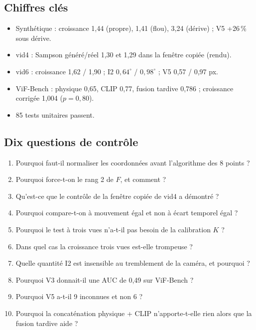 \documentclass[11pt,a4paper]{article}
\begin{document}
\subsection{Chiffres clés}
\begin{itemize}[nosep]
  \item Synthétique : croissance 1,44 (propre), 1,41 (flou), 3,24 (dérive) ; V5 +26\,\% sous dérive.
  \item vid4 : Sampson généré/réel 1,30 et 1,29 dans la fenêtre copiée (rendu).
  \item vid6 : croissance 1,62 / 1,90 ; I2 $0{,}64^\circ$ / $0{,}98^\circ$ ; V5 0,57 / 0,97 px.
  \item ViF-Bench : physique 0,65, CLIP 0,77, fusion tardive 0,786 ; croissance corrigée 1,004 ($p=0{,}80$).
  \item 85 tests unitaires passent.
\end{itemize}

\subsection{Dix questions de contrôle}
\begin{enumerate}
  \item Pourquoi faut-il normaliser les coordonnées avant l'algorithme des 8 points ?
  \item Pourquoi force-t-on le rang 2 de $F$, et comment ?
  \item Qu'est-ce que le contrôle de la fenêtre copiée de vid4 a démontré ?
  \item Pourquoi compare-t-on à mouvement égal et non à écart temporel égal ?
  \item Pourquoi le test à trois vues n'a-t-il pas besoin de la calibration $K$ ?
  \item Dans quel cas la croissance trois vues est-elle trompeuse ?
  \item Quelle quantité I2 est insensible au tremblement de la caméra, et pourquoi ?
  \item Pourquoi V3 donnait-il une AUC de 0,49 sur ViF-Bench ?
  \item Pourquoi V5 a-t-il 9 inconnues et non 6 ?
  \item Pourquoi la concaténation physique + CLIP n'apporte-t-elle rien alors que la fusion tardive aide ?
\end{enumerate}

\newpage
\end{document}

